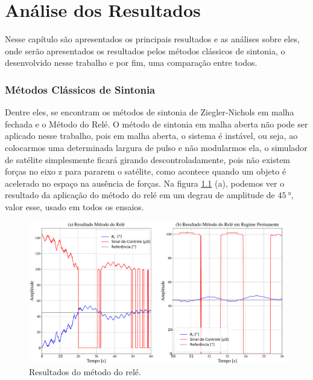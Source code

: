 \chapter{Análise dos Resultados}

Nesse capítulo são apresentados os principais resultados e as análises sobre eles, onde serão apresentados os resultados pelos métodos clássicos de sintonia, o desenvolvido nesse trabalho e por fim, uma comparação entre todos.


\subsection{Métodos Clássicos de Sintonia}

Dentre eles, se encontram os métodos de sintonia de Ziegler-Nichols em malha fechada e o Método do Relé. O método de sintonia em malha aberta não pode ser aplicado nesse trabalho, pois em malha aberta, o sistema é instável, ou seja, ao colocarmos uma determinada largura de pulso e não modularmos ela, o simulador de satélite simplesmente ficará girando descontroladamente, pois não existem forças no eixo z para pararem o satélite, como acontece quando um objeto é acelerado no espaço na ausência de forças. Na figura \ref{fig:relay} (a), podemos ver o resultado da aplicação do método do relé em um degrau de amplitude de $\SI{45}{\degree}$, valor esse, usado em todos os ensaios.

\begin{figure}[H]
  \caption{Resultados do método do relé.}
  \begin{center}
      \includegraphics[scale=0.35]{resultados/img/relay}
  \end{center}
  \label{fig:relay}
\end{figure}
 
